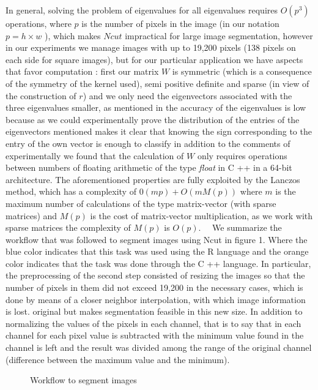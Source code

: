 \documentclass[conference]{IEEEtran}
\begin{document}
In general, solving the problem of eigenvalues for all eigenvalues requires $ O (p ^ 3) $ operations, where $ p $ is the number of pixels in the image (in our notation $ p = h \times w $ ), which makes $ Ncut $ impractical for large image segmentation, however in our experiments we manage images with up to 19,200 pixels (138 pixels on each side for square images), but for our particular application we have aspects that favor computation : first our matrix $ W $ is symmetric (which is a consequence of the symmetry of the kernel used), semi positive definite and sparse (in view of the construction of $ r $) and we only need the eigenvectors associated with the three eigenvalues smaller, as mentioned in \cite{Ncut} the accuracy of the eigenvalues is low because as we could experimentally prove the distribution of the entries of the eigenvectors mentioned makes it clear that knowing the sign corresponding to the entry of the own vector is enough to classify in addition to the comments of \cite{Ncut} experimentally we found that the calculation of $ W $ only requires operations between numbers of floating arithmetic of the type \textit {float } in C ++ in a 64-bit architecture. The aforementioned properties are fully exploited by the Lanczos method, which has a complexity of $ 0 (mp) + O (mM (p)) $ \cite{MatrixC} where $ m $ is the maximum number of calculations of the type matrix-vector (with sparse matrices) and $ M (p) $ is the cost of matrix-vector multiplication, as we work with sparse matrices the complexity of $ M (p) $ is $ O (p) $. \ \ 
We summarize the workflow that was followed to segment images using Ncut in figure 1. Where the blue color indicates that this task was used using the R language and the orange color indicates that the task was done through the C ++ language. In particular, the preprocessing of the second step consisted of resizing the images so that the number of pixels in them did not exceed 19,200 in the necessary cases, which is done by means of a closer neighbor interpolation, with which image information is lost. original but makes segmentation feasible in this new size. In addition to normalizing the values of the pixels in each channel, that is to say that in each channel for each pixel value is subtracted with the minimum value found in the channel is left and the result was divided among the range of the original channel (difference between the maximum value and the minimum). 
\begin{figure}[htbp]
\caption{Workflow to segment images}
\label{workflow}
\end{figure}\\
\end{document}
